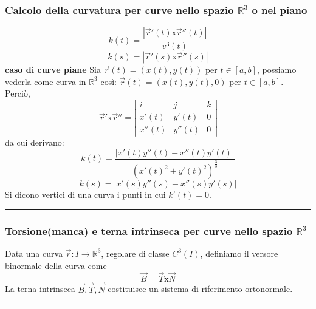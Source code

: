 \subsubsection*{Calcolo della curvatura per curve nello spazio $\mathbb{R}^3$ o nel piano}
\[
    k(t) = \frac{|\vec{r}'(t) \text{x} \vec{r}''(t)|}{v^3(t)}
\]
\[
    k(s) = |\vec{r}'(s) \text{x} \vec{r}''(s)|
\]
\newline
\textbf{caso di curve piane}\newline
Sia $\vec{r}(t) =(x(t), y(t))$ per $t \in[a,b]$, possiamo vederla come curva in $\mathbb{R}^3$ così: $\vec{r}(t) = (x(t), y(t), 0)$ per $t \in[a,b]$.\newline
Perciò,
\[
    \vec{r}' \text{x} \vec{r}'' =\left|\begin{matrix}
        i \;\;& j \;\;& k \\
        x'(t) & y'(t) & 0\\
        x''(t) & y''(t) & 0
    \end{matrix} \right|
\]
da cui derivano:
\[
    k(t) = \frac{|x'(t)y''(t) - x''(t) y'(t)|}{(x'(t)^2 + y'(t)^2)^{\frac{3}{3}}}
\]
\[
    k(s) = |x'(s) y''(s) - x''(s) y'(s)|
\]
\newline
\newline
Si dicono vertici di una curva i punti in cui $k'(t) = 0$.\newline
\rule{\textwidth}{0,4pt}
\subsubsection*{Torsione(manca) e terna intrinseca per curve nello spazio $\mathbb{R}^3$}
Data una curva $\vec{r} : I \rightarrow \mathbb{R}^3$, regolare di classe $C^3(I)$, definiamo il versore binormale della curva come
\[
    \vec{B} = \vec{T} \text{x} \vec{N}
\]
La terna intrinseca $\vec{B}, \vec{T}, \vec{N}$ costituisce un sistema di riferimento ortonormale.\newline
\rule{\textwidth}{2pt}
